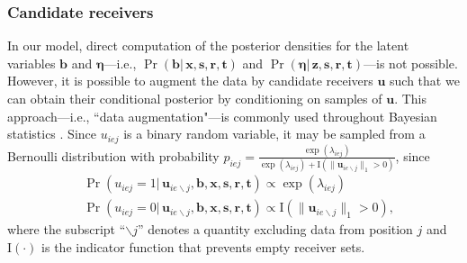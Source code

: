\documentclass[ba]{imsart}
\numberwithin{equation}{section}
\theoremstyle{plain}
\begin{document}
	\subsubsection{Candidate receivers}
	In our model, direct computation of the posterior densities for the latent variables $\boldsymbol{b}$ and $\boldsymbol{\eta}$---i.e., $\Pr(\boldsymbol{b}|\,\boldsymbol{x},\boldsymbol{s}, \boldsymbol{r},\boldsymbol{t})$ and $\Pr(\boldsymbol{\eta}|\,\boldsymbol{z},\boldsymbol{s}, \boldsymbol{r},\boldsymbol{t})$---is not possible. However, it is possible to augment the data by candidate receivers $\boldsymbol{u}$ such that we can obtain their conditional posterior by conditioning on samples of $\boldsymbol{u}$. %
	This approach---i.e., ``data augmentation"---is commonly used throughout Bayesian statistics \citep{tanner1987calculation,neal2015exact}. Since $u_{iej}$ is a binary random variable, it may be sampled from a Bernoulli distribution with probability $p_{iej} =\frac{\exp(\lambda_{iej})}{\exp(\lambda_{iej})+\text{I}(\lVert\boldsymbol{u}_{ie\backslash j}\rVert_1 > 0 )}$, since
	\begin{equation}
		\begin{aligned}
			&\Pr(u_{iej}=1| \,\boldsymbol{u}_{ie\backslash j}, \boldsymbol{b}, \boldsymbol{x},\boldsymbol{s}, \boldsymbol{r},\boldsymbol{t}) \propto \exp(\lambda_{iej}) \\
			&\Pr(u_{iej}=0|\, \boldsymbol{u}_{ie\backslash j},\boldsymbol{b}, \boldsymbol{x},\boldsymbol{s}, \boldsymbol{r},\boldsymbol{t})\propto \text{I}(\lVert\boldsymbol{u}_{ie\backslash j}\rVert_1 > 0 ),
		\end{aligned}
		\label{eqn:latentreceiver}
	\end{equation}
	where the subscript ``$\backslash j$'' denotes a quantity excluding data from position $j$ and $\text{I}(\cdot)$ is the indicator function that prevents empty receiver sets. 
\end{document}
